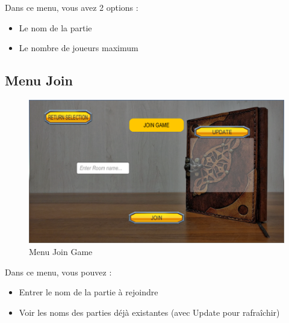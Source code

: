 \documentclass[a4paper, 11pt]{article}
\begin{document}
	\noindent Dans ce menu, vous avez 2 options :
	\begin{itemize}
		\item Le nom de la partie 
		\item Le nombre de joueurs maximum
	\end{itemize}
	
	\subsection{Menu Join}
	\begin{figure}[!ht]
		\centering
		\includegraphics[scale=0.3]{images/join.png}
		\caption{Menu Join Game}
	\end{figure}
	
	\noindent Dans ce menu, vous pouvez :
	\begin{itemize}
		\item Entrer le nom de la partie à rejoindre
		\item Voir les noms des parties déjà existantes (avec Update pour rafraîchir)
	\end{itemize}
	
	\clearpage
	
\end{document}
